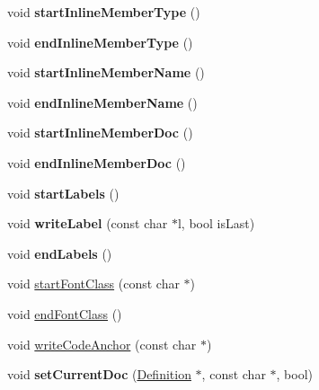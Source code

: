 \begin{DoxyCompactItemize}
\item 
\hypertarget{class_latex_generator_a64d71adb23a46d9cd81eefa97d926cf6}{void {\bfseries start\-Inline\-Member\-Type} ()}\label{class_latex_generator_a64d71adb23a46d9cd81eefa97d926cf6}

\item 
\hypertarget{class_latex_generator_a908e01a4310b5e9fe1e6493a87c3f30e}{void {\bfseries end\-Inline\-Member\-Type} ()}\label{class_latex_generator_a908e01a4310b5e9fe1e6493a87c3f30e}

\item 
\hypertarget{class_latex_generator_a3307ae57ec582f244a790325900c1c96}{void {\bfseries start\-Inline\-Member\-Name} ()}\label{class_latex_generator_a3307ae57ec582f244a790325900c1c96}

\item 
\hypertarget{class_latex_generator_a41cbfeb50f86a4c1531e2012dbcbb209}{void {\bfseries end\-Inline\-Member\-Name} ()}\label{class_latex_generator_a41cbfeb50f86a4c1531e2012dbcbb209}

\item 
\hypertarget{class_latex_generator_a2a23f25caeb56aba89bc2b2c4147a2d2}{void {\bfseries start\-Inline\-Member\-Doc} ()}\label{class_latex_generator_a2a23f25caeb56aba89bc2b2c4147a2d2}

\item 
\hypertarget{class_latex_generator_a7a50d2a68d8d8805c86482012f422cba}{void {\bfseries end\-Inline\-Member\-Doc} ()}\label{class_latex_generator_a7a50d2a68d8d8805c86482012f422cba}

\item 
\hypertarget{class_latex_generator_aa1c00a079e425e24bbbb9291a698cbf2}{void {\bfseries start\-Labels} ()}\label{class_latex_generator_aa1c00a079e425e24bbbb9291a698cbf2}

\item 
\hypertarget{class_latex_generator_a4877c6f161162a399bf051570dee0c4a}{void {\bfseries write\-Label} (const char $\ast$l, bool is\-Last)}\label{class_latex_generator_a4877c6f161162a399bf051570dee0c4a}

\item 
\hypertarget{class_latex_generator_a26e386d6fcaae518c16e018bee486a61}{void {\bfseries end\-Labels} ()}\label{class_latex_generator_a26e386d6fcaae518c16e018bee486a61}

\item 
void \hyperlink{class_latex_generator_ad907f4c47cf56f8aac603de5537963f0}{start\-Font\-Class} (const char $\ast$)
\item 
void \hyperlink{class_latex_generator_ab7851025d80a6d1ed6dd8e25016136e1}{end\-Font\-Class} ()
\item 
void \hyperlink{class_latex_generator_a688757a1dcb8c6bef1202433a36083a7}{write\-Code\-Anchor} (const char $\ast$)
\item 
\hypertarget{class_latex_generator_a71a2ac1fad218c1ccb067138cdfaae22}{void {\bfseries set\-Current\-Doc} (\hyperlink{class_definition}{Definition} $\ast$, const char $\ast$, bool)}\label{class_latex_generator_a71a2ac1fad218c1ccb067138cdfaae22}


\end{DoxyCompactItemize}
